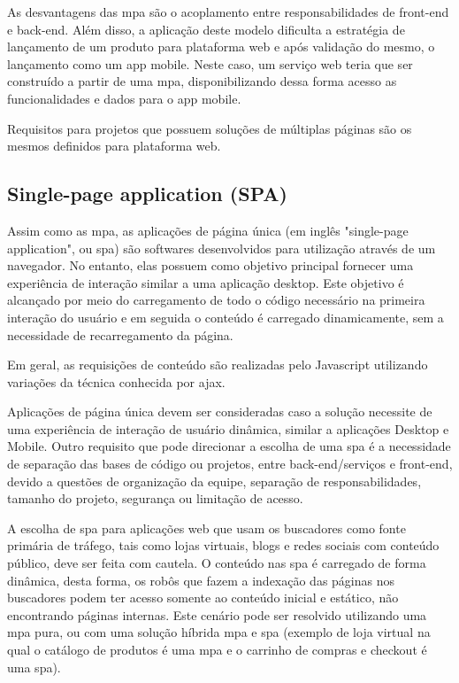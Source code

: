 As desvantagens das \ac{mpa} são o acoplamento entre responsabilidades de front-end e back-end. Além disso, a aplicação deste modelo dificulta a estratégia de lançamento de um produto para plataforma web e após validação do mesmo, o lançamento como um app mobile. Neste caso, um serviço web teria que ser construído a partir de uma \ac{mpa}, disponibilizando dessa forma acesso as funcionalidades e dados para o app mobile. 

Requisitos para projetos que possuem soluções de múltiplas páginas são os mesmos definidos para plataforma web.


\subsection{Single-page application (SPA)}

Assim como as \ac{mpa}, as aplicações de página única (em inglês "single-page application", ou \acs{spa}) são softwares desenvolvidos para utilização através de um navegador. No entanto, elas possuem como objetivo principal fornecer uma experiência de interação similar a uma aplicação desktop. Este objetivo é alcançado por meio do carregamento de todo o código necessário na primeira interação do usuário e em seguida o conteúdo é carregado dinamicamente, sem a necessidade de recarregamento da página. 

Em geral, as requisições de conteúdo são realizadas pelo Javascript utilizando variações da técnica conhecida por \ac{ajax}.

Aplicações de página única devem ser consideradas caso a solução necessite de uma experiência de interação de usuário dinâmica, similar a aplicações Desktop e Mobile. Outro requisito que pode direcionar a escolha de uma \acs{spa} é a necessidade de separação das bases de código ou projetos, entre back-end/serviços e front-end, devido a questões de organização da equipe, separação de responsabilidades, tamanho do projeto, segurança ou limitação de acesso.

A escolha de \acs{spa} para aplicações web que usam os buscadores como fonte primária de tráfego, tais como lojas virtuais, blogs e redes sociais com conteúdo público, deve ser feita com cautela. O conteúdo nas \acs{spa} é carregado de forma dinâmica, desta forma, os robôs que fazem a indexação das páginas nos buscadores podem ter acesso somente ao conteúdo inicial e estático, não encontrando páginas internas. Este cenário pode ser resolvido utilizando uma \ac{mpa} pura, ou com uma solução híbrida \ac{mpa} e \ac{spa} (exemplo de loja virtual na qual o catálogo de produtos é uma \ac{mpa} e o carrinho de compras e checkout é uma \ac{spa}).  

